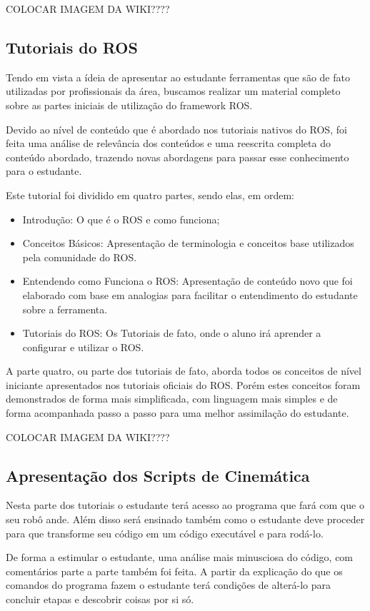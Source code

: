 COLOCAR IMAGEM DA WIKI????


\subsection{Tutoriais do ROS}
Tendo em vista a ídeia de apresentar ao estudante ferramentas que são de fato utilizadas por profissionais da área, buscamos realizar um material completo sobre as partes iniciais de utilização do framework ROS.

Devido ao nível de conteúdo que é abordado nos tutoriais nativos do ROS, foi feita uma análise de relevância dos conteúdos e uma reescrita completa do conteúdo abordado, trazendo novas abordagens para passar esse conhecimento para o estudante.

Este tutorial foi dividido em quatro partes, sendo elas, em ordem:
\begin{itemize}
	\item Introdução: O que é o ROS e como funciona;
	\item Conceitos Básicos: Apresentação de terminologia e conceitos base utilizados pela comunidade do ROS.
	\item Entendendo como Funciona o ROS: Apresentação de conteúdo novo que foi elaborado com base em analogias para facilitar o entendimento do estudante sobre a ferramenta.
	\item Tutoriais do ROS: Os Tutoriais de fato, onde o aluno irá aprender a configurar e utilizar o ROS.
\end{itemize}

A parte quatro, ou parte dos tutoriais de fato, aborda todos os conceitos de nível iniciante apresentados nos tutoriais oficiais do ROS. Porém estes conceitos foram demonstrados de forma mais simplificada, com linguagem mais simples e de forma acompanhada passo a passo para uma melhor assimilação do estudante.

COLOCAR IMAGEM DA WIKI????

\subsection{Apresentação dos Scripts de Cinemática}
Nesta parte dos tutoriais o estudante terá acesso ao programa que fará com que o seu robô ande. Além disso será ensinado também como o estudante deve proceder para que transforme seu código em um código executável e para rodá-lo.

De forma a estimular o estudante, uma análise mais minusciosa do código, com comentários parte a parte também foi feita. A partir da explicação do que os comandos do programa fazem o estudante terá condições de alterá-lo para concluir etapas e descobrir coisas por si só.

